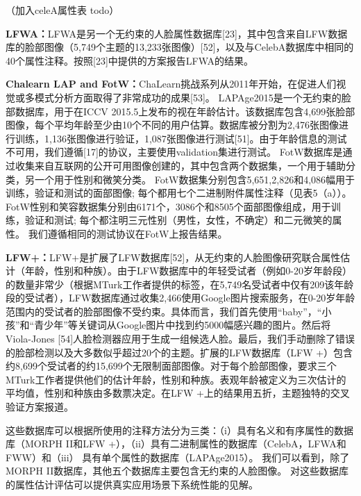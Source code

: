 （加入celeA属性表 todo）

\textbf{LFWA：}LFWA是另一个无约束的人脸属性数据库[23]，其中包含来自LFW数据库的脸部图像（5,749个主题的13,233张图像）[52]，以及与CelebA数据库中相同的40个属性注释。按照[23]中提供的方案报告LFWA的结果。

\textbf{Chalearn LAP and FotW：}ChaLearn挑战系列从2011年开始，在促进人们视觉或多模式分析方面取得了非常成功的成果[53]。 
LAPAge2015是一个无约束的脸部数据库，用于在ICCV 2015.5上发布的视在年龄估计。该数据库包含4,699张脸部图像，每个平均年龄至少由10个不同的用户估算。数据库被分割为2,476张图像进行训练，1,136张图像进行验证，1,087张图像进行测试[51]。由于年龄信息的测试不可用，我们遵循[17]的协议，主要使用validation集进行测试。 FotW数据库是通过收集来自互联网的公开可用图像创建的，其中包含两个数据集，一个用于辅助分类，另一个用于性别和微笑分类。 FotW数据集分别包含5,651,2,826和4,086幅用于训练，验证和测试的面部图像; 每个都用七个二进制附件属性注释（见表5（a））。 FotW性别和笑容数据集分别由6171个，3086个和8505个面部图像组成，用于训练，验证和测试; 每个都注明三元性别（男性，女性，不确定）和二元微笑的属性。 我们遵循相同的测试协议在FotW上报告结果。

\textbf{LFW+：}LFW+是扩展了LFW数据库[52]，从无约束的人脸图像研究联合属性估计（年龄，性别和种族）。由于LFW数据库中的年轻受试者（例如0-20岁年龄段）的数量非常少（根据MTurk工作者提供的标签，在5,749名受试者中仅有209该年龄段的受试者），LFW数据库通过收集2,466使用Google图片搜索服务，在0-20岁年龄范围内的受试者的脸部图像不受约束。具体而言，我们首先使用“baby”，“小孩”和“青少年”等关键词从Google图片中找到约5000幅感兴趣的图片。然后将Viola-Jones [54]人脸检测器应用于生成一组候选人脸。最后，我们手动删除了错误的脸部检测以及大多数似乎超过20个的主题。扩展的LFW数据库（LFW +）包含约8,699个受试者的约15,699个无限制面部图像。对于每个脸部图像，要求三个MTurk工作者提供他们的估计年龄，性别和种族。表观年龄被定义为三次估计的平均值，性别和种族由多数票决定。在LFW +上的结果用五折，主题独特的交叉验证方案报道。

\textbf{}

这些数据库可以根据所使用的注释方法分为三类：（i）具有名义和有序属性的数据库（MORPH II和LFW +），（ii）具有二进制属性的数据库（CelebA，LFWA和FWW）和（iii） 具有单个属性的数据库（LAPAge2015）。 我们可以看到，除了MORPH II数据库，其他五个数据库主要包含无约束的人脸图像。 对这些数据库的属性估计评估可以提供真实应用场景下系统性能的见解。 


